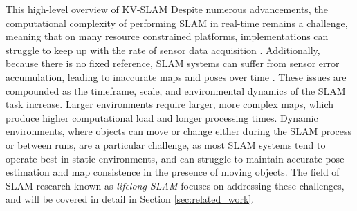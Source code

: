 This high-level overview of KV-SLAM Despite numerous advancements, the computational complexity of performing SLAM in real-time remains a challenge, meaning that on many resource constrained platforms, implementations can struggle to keep up with the rate of sensor data acquisition \cite{semenovaQuantitativeAnalysisSystem2022}. Additionally, because there is no fixed reference, SLAM systems can suffer from sensor error accumulation, leading to inaccurate maps and poses over time \cite{cadenaPresentFutureSimultaneous2016}. These issues are compounded as the timeframe, scale, and environmental dynamics of the SLAM task increase. Larger environments require larger, more complex maps, which produce higher computational load and longer processing times. Dynamic environments, where objects can move or change either during the SLAM process or between runs, are a particular challenge, as most SLAM systems tend to operate best in static environments, and can struggle to maintain accurate pose estimation and map consistence in the presence of moving objects. The field of SLAM research known as \textit{lifelong SLAM} \cite{cadenaPresentFutureSimultaneous2016} focuses on addressing these challenges, and will be covered in detail in Section \ref{sec:related_work}.
